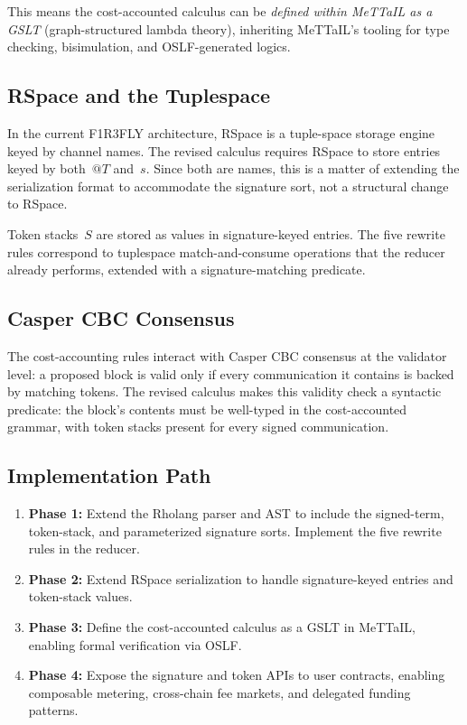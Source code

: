 \documentclass[11pt,a4paper]{article}
\makeatletter
\newcommand{\quot}[1]{@#1}
\makeatother
\begin{document}
\noindent
This means the cost-accounted calculus can be \emph{defined
within MeTTaIL as a GSLT} (graph-structured lambda theory),
inheriting MeTTaIL's tooling for type checking, bisimulation,
and OSLF-generated logics.

\subsection{RSpace and the Tuplespace}

In the current F1R3FLY architecture, RSpace is a tuple-space
storage engine keyed by channel names.  The revised calculus
requires RSpace to store entries keyed by both~$\quot{T}$
and~$s$.  Since both are names, this is a matter of extending
the serialization format to accommodate the signature sort,
not a structural change to RSpace.

Token stacks~$S$ are stored as values in signature-keyed
entries.  The five rewrite rules correspond to tuplespace
match-and-consume operations that the reducer already performs,
extended with a signature-matching predicate.

\subsection{Casper CBC Consensus}

The cost-accounting rules interact with Casper CBC consensus at
the validator level:  a proposed block is valid only if every
communication it contains is backed by matching tokens.  The
revised calculus makes this validity check a syntactic
predicate: the block's contents must be well-typed in the
cost-accounted grammar, with token stacks present for every
signed communication.

\subsection{Implementation Path}

\begin{enumerate}[nosep]
  \item \textbf{Phase 1:}  Extend the Rholang parser and AST
    to include the signed-term, token-stack, and parameterized
    signature sorts.  Implement the five rewrite rules in the
    reducer.
  \item \textbf{Phase 2:}  Extend RSpace serialization to
    handle signature-keyed entries and token-stack values.
  \item \textbf{Phase 3:}  Define the cost-accounted calculus as
    a GSLT in MeTTaIL, enabling formal verification via OSLF.
  \item \textbf{Phase 4:}  Expose the signature and token APIs
    to user contracts, enabling composable metering,
    cross-chain fee markets, and delegated funding patterns.
\end{enumerate}
\end{document}
